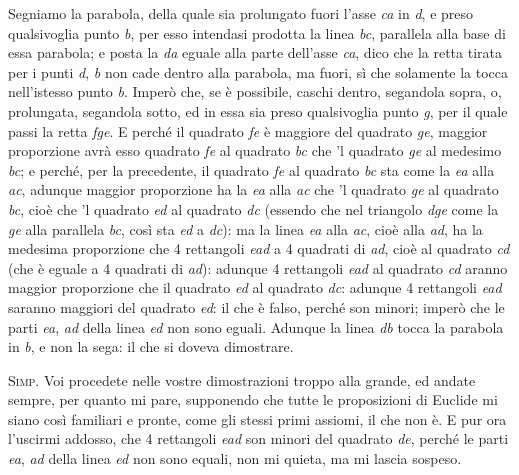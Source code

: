 \documentclass[11pt,twoside,openany]{book}
\newcommand{\speaker}[1]{\textcolor{rubric}{\textsc{#1}}\space}
\begin{document}
Segniamo la parabola, della quale sia prolungato fuori l'asse \emph{ca} in \emph{d}, e preso qualsivoglia punto \emph{b}, per esso intendasi prodotta la linea \emph{bc}, parallela alla base di essa parabola; e posta la \emph{da} eguale alla parte dell'asse \emph{ca}, dico che la retta tirata per i punti \emph{d}, \emph{b} non cade dentro alla parabola, ma fuori, sì che solamente la tocca nell'istesso punto \emph{b}. Imperò che, se è possibile, caschi dentro, segandola sopra, o, prolungata, segandola sotto, ed in essa sia preso qualsivoglia punto \emph{g}, per il quale passi la retta \emph{fge}. E perché il quadrato \emph{fe} è maggiore del quadrato \emph{ge}, maggior proporzione avrà esso quadrato \emph{fe} al quadrato \emph{bc} che 'l quadrato \emph{ge} al medesimo \emph{bc}; e perché, per la precedente, il quadrato \emph{fe} al quadrato \emph{bc} sta come la \emph{ea} alla \emph{ac}, adunque maggior proporzione ha la \emph{ea} alla \emph{ac} che 'l quadrato \emph{ge} al quadrato \emph{bc}, cioè che 'l quadrato \emph{ed} al quadrato \emph{dc} (essendo che nel triangolo \emph{dge} come la \emph{ge} alla parallela \emph{bc}, così sta \emph{ed} a \emph{dc}): ma la linea \emph{ea} alla \emph{ac}, cioè alla \emph{ad}, ha la medesima proporzione che 4 rettangoli \emph{ead} a 4 quadrati di \emph{ad}, cioè al quadrato \emph{cd} (che è eguale a 4 quadrati di \emph{ad}): adunque 4 rettangoli \emph{ead} al quadrato \emph{cd} aranno maggior proporzione che il quadrato \emph{ed} al quadrato \emph{dc}: adunque 4 rettangoli \emph{ead} saranno maggiori del quadrato \emph{ed}: il che è falso, perché son minori; imperò che le parti \emph{ea}, \emph{ad} della linea \emph{ed} non sono eguali. Adunque la linea \emph{db} tocca la parabola in \emph{b}, e non la sega: il che si doveva dimostrare.

\speaker{Simp.} Voi procedete nelle vostre dimostrazioni troppo alla grande, ed andate sempre, per quanto mi pare, supponendo che tutte le proposizioni di Euclide mi siano così familiari e pronte, come gli stessi primi assiomi, il che non è. E pur ora l'uscirmi addosso, che 4 rettangoli \emph{ead} son minori del quadrato \emph{de}, perché le parti \emph{ea}, \emph{ad} della linea \emph{ed} non sono equali, non mi quieta, ma mi lascia sospeso.
\end{document}
